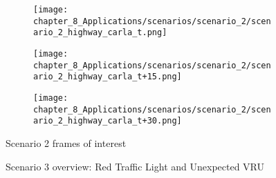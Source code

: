 \begin{figure}[]
	\begin{subfigure}{0.48\textwidth}
		\texttt{[image: chapter\_8\_Applications/scenarios/scenario\_2/scenario\_2\_highway\_carla\_t.png]}
		\caption{}
		\label{subfig:chapter_8_Applications/scenarios/scenario_2/scenario_2_highway_carla_t}
	\end{subfigure}
    \hfill
	\begin{subfigure}{0.48\textwidth}
		\caption{}
		\label{subfig:chapter_8_Applications/scenarios/scenario_2/scenario_2_highway_rviz_t}
	\end{subfigure}
	\begin{subfigure}{0.48\textwidth}
		\texttt{[image: chapter\_8\_Applications/scenarios/scenario\_2/scenario\_2\_highway\_carla\_t+15.png]}
		\caption{}
		\label{subfig:chapter_8_Applications/scenarios/scenario_2/scenario_2_highway_carla_t+15}
	\end{subfigure}
	\hfill
	\begin{subfigure}{0.48\textwidth}
		\caption{}
		\label{subfig:chapter_8_Applications/scenarios/scenario_2/scenario_2_highway_rviz_t+15}
	\end{subfigure}
	\begin{subfigure}{0.48\textwidth}
		\texttt{[image: chapter\_8\_Applications/scenarios/scenario\_2/scenario\_2\_highway\_carla\_t+30.png]}
		\caption{}
		\label{subfig:chapter_8_Applications/scenarios/scenario_2/scenario_2_highway_carla_t+30}
	\end{subfigure}
	\hfill
	\begin{subfigure}{0.48\textwidth}
		\caption{}
		\label{subfig:chapter_8_Applications/scenarios/scenario_2/scenario_2_highway_rviz_t+30}
	\end{subfigure}
	\caption{Scenario 2 frames of interest}
	\label{fig:chapter_8_Applications/scenarios/scenario_2_frames_of_interest}
\end{figure}


\begin{figure}[]
	\centering
	\caption{Scenario 3 overview: Red Traffic Light and Unexpected \ac{VRU}}
	\label{fig:chapter_8_Applications/scenarios/scenario_3/scenario_3_route1_town01_training}
\end{figure}

